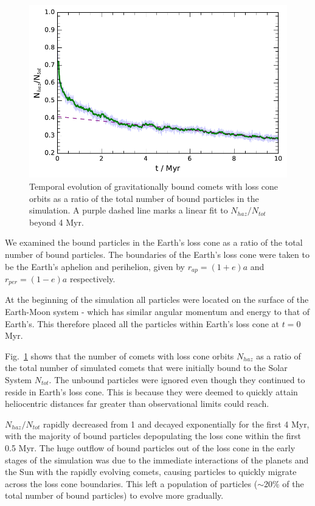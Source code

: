\begin{figure}[t!]
    \centering
    \includegraphics{figures/exotic_ratio.pdf}
    \caption[Bound particles in the Earth's loss cone]{Temporal evolution of gravitationally bound comets with loss cone orbits as a ratio of the total number of bound particles in the simulation. A purple dashed line marks a linear fit to $N_{haz}/N_{tot}$ beyond 4 Myr.}
    \label{fig:exotic}
\end{figure}

We examined the bound particles in the Earth's loss cone as a ratio of the total number of bound particles. The boundaries of the Earth's loss cone were taken to be the Earth's aphelion and perihelion, given by $r_{ap} = (1+e)a$ and $r_{per} = (1-e)a$ respectively.

At the beginning of the simulation all particles were located on the surface of the Earth-Moon system - which has similar angular momentum and energy to that of Earth's. This therefore placed all the particles within Earth's loss cone at $t=0$ Myr. 

Fig.~\ref{fig:exotic} shows that the number of comets with loss cone orbits $N_{haz}$ as a ratio of the total number of simulated comets that were initially bound to the Solar System $N_{tot}$. The unbound particles were ignored even though they continued to reside in Earth's loss cone. This is because they were deemed to quickly attain heliocentric distances far greater than observational limits could reach.

$N_{haz}/N_{tot}$ rapidly decreased from 1 and decayed exponentially for the first 4 Myr, with the majority of bound particles depopulating the loss cone within the first 0.5 Myr. The huge outflow of bound particles out of the loss cone in the early stages of the simulation was due to the immediate interactions of the planets and the Sun with the rapidly evolving comets, causing particles to quickly migrate across the loss cone boundaries. This left a population of particles ($\sim$20\% of the total number of bound particles) to evolve more gradually.

